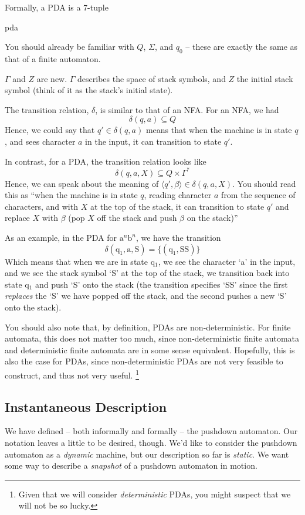 Formally, a PDA is a 7-tuple
\begin{center}
    {pda}
\end{center}

You should already be familiar with $Q$, $\Sigma$, and $q_0$ -- these are exactly the same as that of a finite automaton.

$\Gamma$ and $Z$ are new. $\Gamma$ describes the space of stack symbols, and $Z$ the initial stack symbol (think of it as the stack's initial state).

The transition relation, $\delta$, is similar to that of an NFA. For an NFA, we had
\[\delta(q, a) \subseteq Q\]
Hence, we could say that $q' \in \delta(q, a)$ means that when the machine is in state $q$, and sees character $a$ in the input, it can transition to state $q'$.

In contrast, for a PDA, the transition relation looks like
\[\delta(q, a, X) \subseteq Q \times \Gamma^{*}\]
Hence, we can speak about the meaning of $\langle q', \beta \rangle \in \delta(q, a, X)$. You should read this as ``when the machine is in state $q$, reading character $a$ from the sequence of characters, and with $X$ at the top of the stack, it can transition to state $q'$ and replace $X$ with $\beta$ (pop $X$ off the stack and push $\beta$ on the stack)''

As an example, in the PDA for $\text{a}^n\text{b}^n$, we have the transition
\[\delta(\text{q}_1, \text{a}, \text{S}) = \{(\text{q}_1, \text{SS})\}\]
Which means that when we are in state q$_1$, we see the character `a' in the input, and we see the stack symbol `S' at the top of the stack, we transition back into state q$_1$ and push `S' onto the stack (the transition specifies `SS' since the first \textit{replaces} the `S' we have popped off the stack, and the second pushes a new `S' onto the stack).

You should also note that, by definition, PDAs are non-deterministic. For finite automata, this does not matter too much, since non-deterministic finite automata and deterministic finite automata are in some sense equivalent. Hopefully, this is also the case for PDAs, since non-deterministic PDAs are not very feasible to construct, and thus not very useful. \footnote{Given that we will consider \textit{deterministic} PDAs, you might suspect that we will not be so lucky.}

\subsection{Instantaneous Description}
We have defined -- both informally and formally -- the pushdown automaton. Our notation leaves a little to be desired, though. We'd like to consider the pushdown automaton as a \textit{dynamic} machine, but our description so far is \textit{static}. We want some way to describe a \textit{snapshot} of a pushdown automaton in motion. 

